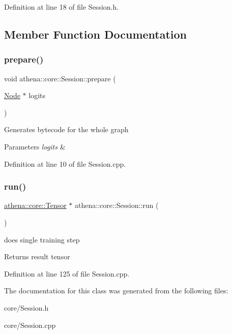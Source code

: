 Definition at line 18 of file Session.\+h.



\subsection{Member Function Documentation}
\mbox{\label{classathena_1_1core_1_1_session_a28b51416420aca2c39d9cf7ee81fe41d}} 
\subsubsection{\texorpdfstring{prepare()}{prepare()}}
{\footnotesize\ttfamily void athena\+::core\+::\+Session\+::prepare (\begin{DoxyParamCaption}\item[{\mbox{\hyperlink{classathena_1_1core_1_1_node}{Node}} $\ast$}]{logits }\end{DoxyParamCaption})}

Generates bytecode for the whole graph 
\begin{DoxyParams}{Parameters}
{\em logits} & \\
\hline
\end{DoxyParams}


Definition at line 10 of file Session.\+cpp.

\mbox{\label{classathena_1_1core_1_1_session_ab08af50ae0bbd2ed5171e1f45a7680ff}} 
\subsubsection{\texorpdfstring{run()}{run()}}
{\footnotesize\ttfamily \mbox{\hyperlink{classathena_1_1core_1_1_tensor}{athena\+::core\+::\+Tensor}} $\ast$ athena\+::core\+::\+Session\+::run (\begin{DoxyParamCaption}{ }\end{DoxyParamCaption})}

does single training step \begin{DoxyReturn}{Returns}
result tensor 
\end{DoxyReturn}


Definition at line 125 of file Session.\+cpp.



The documentation for this class was generated from the following files\+:\begin{DoxyCompactItemize}
\item 
core/Session.\+h\item 
core/Session.\+cpp\end{DoxyCompactItemize}
